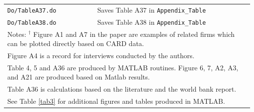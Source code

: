 \documentclass[12pt,notitlepage]{article}
\begin{document}
\begin{table}
{\begin{tabular}{ll}
\texttt{Do/TableA37.do}   & Saves Table A37 in \texttt{Appendix\_Table}\\
\texttt{Do/TableA38.do}   & Saves Table A38 in \texttt{Appendix\_Table}\\
 \bottomrule
\multicolumn{2}{l}{Notes: $^\dagger$ Figure A1 and A7 in the paper are examples of related firms which can be plotted directly based on CARD data.} \\
\multicolumn{2}{l}{Figure A4 is a record for interviews conducted by the authors.}\\
\multicolumn{2}{l}{Table 4, 5 and A36 are produced by MATLAB routines. Figure 6, 7, A2, A3, and A21 are produced based on Matlab results.} \\
\multicolumn{2}{l}{Table A36 is calculations based on the literature and the world bank report.} \\
\multicolumn{2}{l}{See Table \ref{tab3} for additional figures and tables produced in MATLAB.}
\end{tabular}
}
\end{table}

\clearpage
\newpage
\nocite{*}
% 

\end{document}

